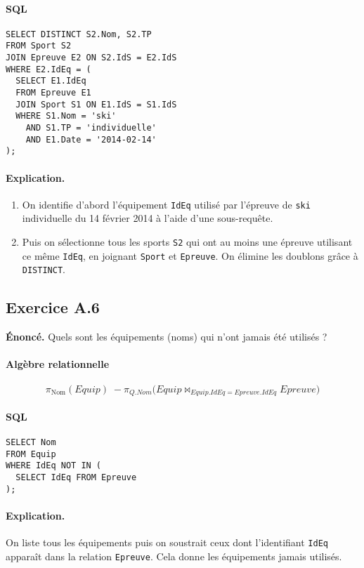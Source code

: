 \documentclass[11pt]{article}
\begin{document}
\paragraph{SQL}
\begin{verbatim}
SELECT DISTINCT S2.Nom, S2.TP
FROM Sport S2
JOIN Epreuve E2 ON S2.IdS = E2.IdS
WHERE E2.IdEq = (
  SELECT E1.IdEq
  FROM Epreuve E1
  JOIN Sport S1 ON E1.IdS = S1.IdS
  WHERE S1.Nom = 'ski'
    AND S1.TP = 'individuelle'
    AND E1.Date = '2014-02-14'
);
\end{verbatim}

\paragraph{Explication.}
\begin{enumerate}
  \item On identifie d'abord l'équipement \texttt{IdEq} utilisé par l'épreuve de \texttt{ski} individuelle du 14 février 2014 à l'aide d'une sous-requête.
  \item Puis on sélectionne tous les sports \texttt{S2} qui ont au moins une épreuve utilisant ce même \texttt{IdEq}, en joignant \texttt{Sport} et \texttt{Epreuve}. On élimine les doublons grâce à \texttt{DISTINCT}.
\end{enumerate}

\subsection*{Exercice A.6}
\textbf{Énoncé.} Quels sont les équipements (noms) qui n'ont jamais été utilisés ?\\

\paragraph{Algèbre relationnelle}
\[
\pi_{\text{Nom}}(Equip)
\;-
\pi_{Q.Nom}\bigl(Equip \bowtie_{Equip.IdEq=Epreuve.IdEq} Epreuve\bigr)
\]

\paragraph{SQL}
\begin{verbatim}
SELECT Nom
FROM Equip
WHERE IdEq NOT IN (
  SELECT IdEq FROM Epreuve
);
\end{verbatim}

\paragraph{Explication.}
On liste tous les équipements puis on soustrait ceux dont l'identifiant \texttt{IdEq} apparaît dans la relation \texttt{Epreuve}. Cela donne les équipements jamais utilisés.
\end{document}

